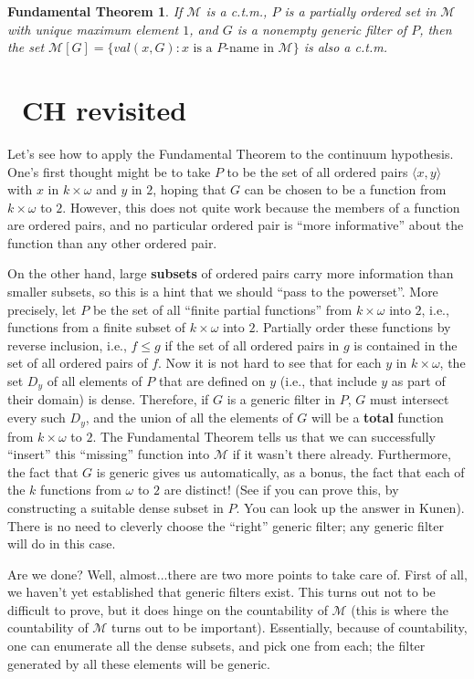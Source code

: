 \documentclass[10pt]{article}
\newcommand\axiom[1]{\textmd{#1}}
\newtheorem*{teo}{Fundamental Theorem}
\theoremstyle{definition}
\theoremstyle{remark}
\begin{document}
\begin{teo}
If $\mathcal M$ is a c.t.m., $P$ is a partially ordered set in $\mathcal M$ with unique maximum element $1$, and $G$ is a nonempty generic filter of $P$, then the set $\mathcal M[G] = \{val(x,G) : x \text{ is a }P\text{-name in }\mathcal M\}$ is also a c.t.m.
\end{teo}

\section{\axiom{~CH} revisited}

Let's see how to apply the Fundamental Theorem to the continuum hypothesis. One's first thought might be to take $P$ to be the set of all ordered pairs $\langle x,y\rangle$ with $x$ in $k \times \omega$ and $y$ in $2$, hoping that $G$ can be chosen to be a function from $k \times \omega$ to $2$. However, this does not quite work because the members of a function are ordered pairs, and no particular ordered pair is ``more informative'' about the function than any other ordered pair.

On the other hand, large \textbf{subsets} of ordered pairs carry more information than smaller subsets, so this is a hint that we should ``pass to the powerset''. More precisely, let $P$ be the set of all ``finite partial functions'' from $k \times \omega$ into $2$, i.e., functions from a finite subset of $k \times \omega$ into $2$. Partially order these functions by reverse inclusion, i.e., $f \leq g$ if the set of all ordered pairs in $g$ is contained in the set of all ordered pairs of $f$. Now it is not hard to see that for each $y$ in $k \times \omega$, the set $D_y$ of all elements of $P$ that are defined on $y$ (i.e., that include $y$ as part of their domain) is dense. Therefore, if $G$ is a generic filter in $P$, $G$ must intersect every such $D_y$, and the union of all the elements of $G$ will be a \textbf{total} function from $k \times \omega$ to $2$. The Fundamental Theorem tells us that we can successfully ``insert'' this ``missing'' function into $\mathcal M$ if it wasn't there already. Furthermore, the fact that $G$ is generic gives us automatically, as a bonus, the fact that each of the $k$ functions from $\omega$ to $2$ are distinct! (See if you can prove this, by constructing a suitable dense subset in $P$. You can look up the answer in Kunen). There is no need to cleverly choose the ``right'' generic filter; any generic filter will do in this case.

Are we done? Well, almost...there are two more points to take care of. First of all, we haven't yet established that generic filters exist. This turns out not to be difficult to prove, but it does hinge on the countability of $\mathcal M$ (this is where the countability of $\mathcal M$ turns out to be important). Essentially, because of countability, one can enumerate all the dense subsets, and pick one from each; the filter generated by all these elements will be generic.
\end{document}
